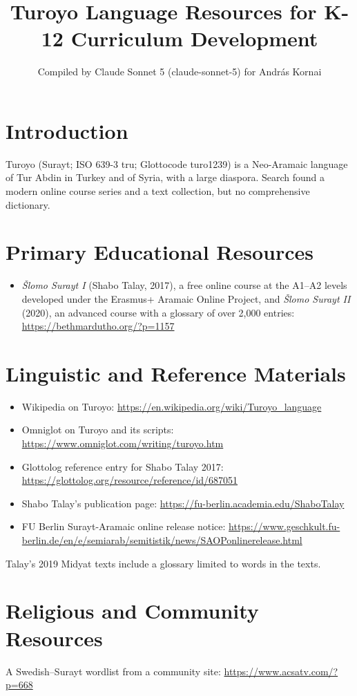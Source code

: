 \documentclass[12pt]{article}
\title{Turoyo Language Resources for K-12 Curriculum Development}
\author{Compiled by Claude Sonnet 5 (claude-sonnet-5) for Andr\'as Kornai}
\date{}
\begin{document}
\maketitle

\section{Introduction}
Turoyo (Surayt; ISO 639-3 tru; Glottocode turo1239) is a Neo-Aramaic language of Tur Abdin in Turkey and of Syria, with a large diaspora. Search found a modern online course series and a text collection, but no comprehensive dictionary.

\section{Primary Educational Resources}
\begin{itemize}
\item \emph{\v{S}lomo Surayt I} (Shabo Talay, 2017), a free online course at the A1--A2 levels developed under the Erasmus+ Aramaic Online Project, and \emph{\v{S}lomo Surayt II} (2020), an advanced course with a glossary of over 2,000 entries: \url{https://bethmardutho.org/?p=1157}
\end{itemize}

\section{Linguistic and Reference Materials}
\begin{itemize}
\item Wikipedia on Turoyo: \url{https://en.wikipedia.org/wiki/Turoyo_language}
\item Omniglot on Turoyo and its scripts: \url{https://www.omniglot.com/writing/turoyo.htm}
\item Glottolog reference entry for Shabo Talay 2017: \url{https://glottolog.org/resource/reference/id/687051}
\item Shabo Talay's publication page: \url{https://fu-berlin.academia.edu/ShaboTalay}
\item FU Berlin Surayt-Aramaic online release notice: \url{https://www.geschkult.fu-berlin.de/en/e/semiarab/semitistik/news/SAOPonlinerelease.html}
\end{itemize}
Talay's 2019 Midyat texts include a glossary limited to words in the texts.

\section{Religious and Community Resources}
A Swedish--Surayt wordlist from a community site: \url{https://www.acsatv.com/?p=668}
\end{document}
